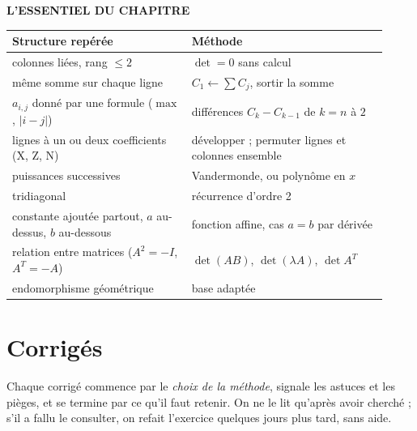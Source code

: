 \documentclass[a4paper,11pt]{article}
\numberwithin{equation}{section}
\numberwithin{figure}{section}
\numberwithin{table}{section}
\theoremstyle{enonce}
\theoremstyle{exemple}
\theoremstyle{remarque}
\newenvironment{essentiel}{\par\needspace{12\baselineskip}\vspace{1.5em}%
  \begin{tcolorbox}[enhanced,unbreakable,colback=white,colframe=white,boxrule=0pt,arc=0pt,
   borderline north={1.4pt}{0pt}{Ocre},left=2pt,right=2pt,top=8pt,bottom=4pt]
  {\sffamily\bfseries\color{Ocre}L'ESSENTIEL DU CHAPITRE}\par\medskip}{\end{tcolorbox}}
\begin{document}
\begin{essentiel}
\small
\begin{tabular}{>{\raggedright}p{0.44\linewidth}p{0.48\linewidth}}
Structure repérée & Méthode\\\midrule
colonnes liées, rang $\leq2$ & $\det=0$ sans calcul\\
même somme sur chaque ligne & $C_1\leftarrow\sum C_j$, sortir la somme\\
$a_{i,j}$ donné par une formule ($\max$, $|i-j|$) & différences $C_k-C_{k-1}$ de $k=n$ à $2$\\
lignes à un ou deux coefficients (X, Z, N) & développer ; permuter lignes et colonnes ensemble\\
puissances successives & Vandermonde, ou polynôme en $x$\\
tridiagonal & récurrence d'ordre 2\\
constante ajoutée partout, $a$ au-dessus, $b$ au-dessous & fonction affine, cas $a=b$ par dérivée\\
relation entre matrices ($A^2=-I$, $A^T=-A$) & $\det(AB)$, $\det(\lambda A)$, $\det A^T$\\
endomorphisme géométrique & base adaptée
\end{tabular}
\end{essentiel}

\renewcommand{\ongletcouleur}{Ocre}
\section{Corrigés}\label{sec:corriges}

Chaque corrigé commence par le \emph{choix de la méthode}, signale les astuces et les pièges, et se termine par ce qu'il faut retenir. On ne le lit qu'après avoir cherché ; s'il a fallu le consulter, on refait l'exercice quelques jours plus tard, sans aide.
\end{document}
